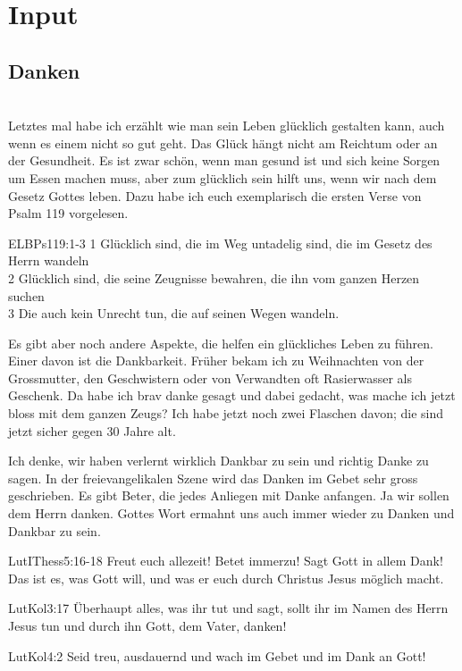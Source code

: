 \documentclass{../inc/mybib}
\begin{document}
\section{ Input }
\begin{spacing}{1.5}
\subsection{Danken}\\
Letztes mal habe ich erzählt wie man sein Leben glücklich gestalten kann, auch wenn es einem nicht so gut geht. Das Glück hängt nicht am Reichtum oder an der Gesundheit. Es ist zwar schön, wenn man gesund ist und sich keine Sorgen um Essen machen muss, aber zum glücklich sein hilft uns, wenn wir nach dem Gesetz Gottes leben. Dazu habe ich euch exemplarisch die ersten Verse von Psalm 119 vorgelesen.
\begin{bibeltext}{ELB}{Ps}{119:1-3}
1 Glücklich sind, die im Weg untadelig sind, die im Gesetz des Herrn wandeln\\
2 Glücklich sind, die seine Zeugnisse bewahren, die ihn vom ganzen Herzen suchen\\
3 Die auch kein Unrecht tun, die auf seinen Wegen wandeln.
\end{bibeltext}
Es gibt aber noch andere Aspekte, die helfen ein glückliches Leben zu führen. Einer davon ist die Dankbarkeit. Früher bekam ich zu Weihnachten von der Grossmutter, den Geschwistern oder von Verwandten oft Rasierwasser als Geschenk. Da habe ich brav danke gesagt und dabei gedacht, was mache ich jetzt bloss mit dem ganzen Zeugs? Ich habe jetzt noch zwei Flaschen davon; die sind jetzt sicher gegen 30 Jahre alt.

Ich denke, wir haben verlernt wirklich Dankbar zu sein und richtig Danke zu sagen. In der freievangelikalen Szene wird das Danken im Gebet sehr gross geschrieben. Es gibt Beter, die jedes Anliegen mit Danke anfangen. Ja wir sollen dem Herrn danken. Gottes Wort ermahnt uns auch immer wieder zu Danken und Dankbar zu sein.
\begin{bibeltext}{Lut}{IThess}{5:16-18}
Freut euch allezeit! Betet immerzu! Sagt Gott in allem Dank! Das ist es, was Gott will, und was er euch durch Christus Jesus möglich macht.
\end{bibeltext}
\begin{bibeltext}{Lut}{Kol}{3:17}
Überhaupt alles, was ihr tut und sagt, sollt ihr im Namen des Herrn Jesus tun und durch ihn Gott, dem Vater, danken!
\end{bibeltext}
\begin{bibeltext}{Lut}{Kol}{4:2}
Seid treu, ausdauernd und wach im Gebet und im Dank an Gott!
\end{bibeltext}


\end{spacing}
\end{document}
